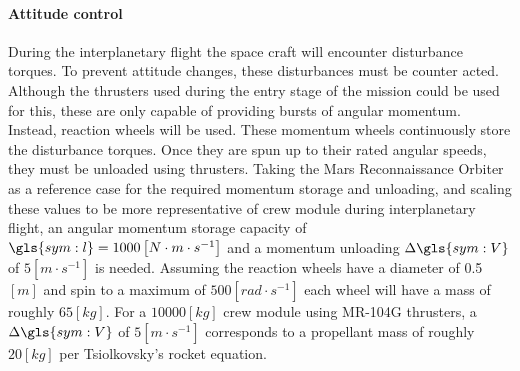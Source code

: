 \paragraph{Attitude control}
During the interplanetary flight the space craft will encounter disturbance torques. To prevent attitude changes, these disturbances must be counter acted. Although the thrusters used during the entry stage of the mission could be used for this, these are only capable of providing bursts of angular momentum. Instead, reaction wheels will be used. These momentum wheels continuously store the disturbance torques. Once they are spun up to their rated angular speeds, they must be unloaded using thrusters. Taking the Mars Reconnaissance Orbiter \cite{You2007} as a reference case for the required momentum storage and unloading, and scaling these values to be more representative of crew module during interplanetary flight, an angular momentum storage capacity of $\gls{sym:l} = 1000 \left[N \cdot m\cdot s^{-1}\right]$ and a momentum unloading $\Delta\gls{sym:V}$ of $5 \left[m\cdot s^{-1}\right]$ is needed. Assuming the reaction wheels have a diameter of 0.5 $[m]$ and spin to a maximum of $500 \left[rad \cdot s^{-1}\right]$ each wheel will have a mass of roughly $65 \left[kg\right]$. For a $10 000 [kg]$ crew module using MR-104G thrusters, a $\Delta\gls{sym:V}$ of $5 \left[m\cdot s^{-1}\right]$ corresponds to a propellant mass of roughly $20 \left[kg\right]$ per Tsiolkovsky's rocket equation. 